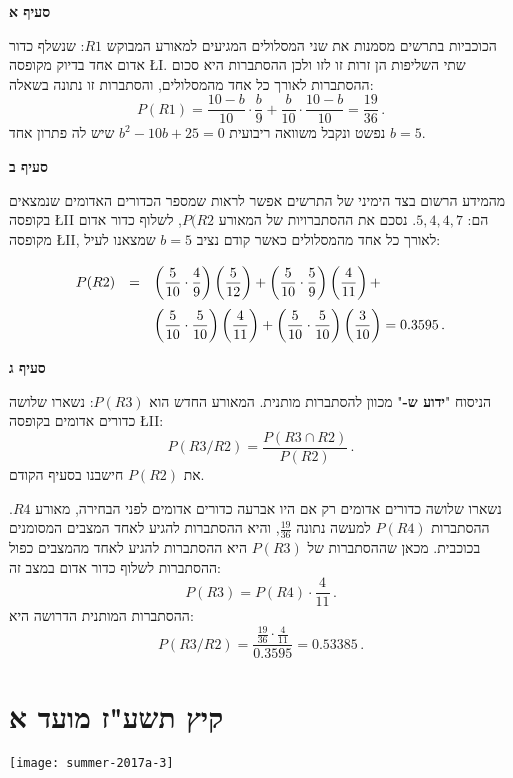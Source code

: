 \textbf{סעיף א}

הכוכביות בתרשים מסמנות את שני המסלולים המגיעים למאורע המבוקש 
$R1$:
שנשלף כדור אדום אחד בדיוק מקופסה
\L{I}.
שתי השליפות הן זרות זו לזו ולכן ההסתברות היא סכום ההסתברות לאורך כל אחד מהמסלולים, והסתברות זו נתונה בשאלה:
\[
P(R1)=\frac{10-b}{10}\cdot\frac{b}{9} + \frac{b}{10}\cdot\frac{10-b}{10} = \frac{19}{36}\,.
\]
נפשט ונקבל משוואה ריבועית 
$b^2-10b+25=0$
שיש לה פתרון אחד
$b=5$.


\textbf{סעיף ב}

מהמידע הרשום בצד הימיני של התרשים אפשר לראות שמספר הכדורים האדומים שנמצאים בקופסה
\L{II}
הם:
$5,4,4,7$.
נסכם את ההסתברויות של המאורע
$P(R2$,
לשלוף כדור אדום מקופסה
\L{II},
לאורך כל אחד מהמסלולים כאשר קודם נציב 
$b=5$
שמצאנו לעיל:
\[
\erh{2.5}
\begin{array}{rcl}
P(R2)&=&\displaystyle\left(\frac{5}{10}\cdot\frac{4}{9}\right)\left(\frac{5}{12}\right)+
\left(\frac{5}{10}\cdot\frac{5}{9}\right)\left(\frac{4}{11}\right)+\\
&&\displaystyle\left(\frac{5}{10}\cdot\frac{5}{10}\right)\left(\frac{4}{11}\right)+
\left(\frac{5}{10}\cdot\frac{5}{10}\right)\left(\frac{3}{10}\right)
=0.3595\,.
\end{array}
\]

\textbf{סעיף ג}

הניסוח
"\textbf{ידוע ש-}"
מכוון להסתברות מותנית. המאורע החדש הוא
$P(R3)$:
נשארו שלושה כדורים אדומים בקופסה 
\L{II}:
\[
P(R3/R2)=\frac{P(R3\cap R2)}{P(R2)}\,.
\]
את
$P(R2)$
חישבנו בסעיף הקודם.

נשארו שלושה כדורים אדומים רק אם היו אברעה כדורים אדומים לפני הבחירה, מאורע 
$R4$.
ההסתברות 
$P(R4)$
למעשה נתונה
$\frac{19}{36}$,
והיא ההסתברות להגיע לאחד המצבים המסומנים בכוכבית. מכאן שההסתברות של 
$P(R3)$
היא ההסתברות להגיע לאחד מהמצבים כפול ההסתברות לשלוף כדור אדום במצב זה:
\[
P(R3)=P(R4)\cdot \textstyle\frac{4}{11}\,.
\]
ההסתברות המותנית הדרושה היא:
\[
P(R3/R2)=\frac{\frac{19}{36}\cdot\frac{4}{11}}{0.3595}=0.53385\,.
\]


\section{קיץ תשע"ז מועד א}

\begin{center}
\texttt{[image: summer-2017a-3]}
\end{center}

